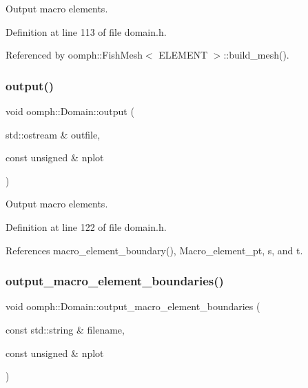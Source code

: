 Output macro elements. 



Definition at line 113 of file domain.\+h.



Referenced by oomph\+::\+Fish\+Mesh$<$ E\+L\+E\+M\+E\+N\+T $>$\+::build\+\_\+mesh().

\mbox{\label{classoomph_1_1Domain_ab7ccc375ba2e46ffb11e4e2c5c485578}} 
\subsubsection{\texorpdfstring{output()}{output()}\hspace{0.1cm}{\footnotesize\ttfamily [2/2]}}
{\footnotesize\ttfamily void oomph\+::\+Domain\+::output (\begin{DoxyParamCaption}\item[{std\+::ostream \&}]{outfile,  }\item[{const unsigned \&}]{nplot }\end{DoxyParamCaption})\hspace{0.3cm}{\ttfamily [inline]}}



Output macro elements. 



Definition at line 122 of file domain.\+h.



References macro\+\_\+element\+\_\+boundary(), Macro\+\_\+element\+\_\+pt, s, and t.

\mbox{\label{classoomph_1_1Domain_ac663be35932981a1c02b3ed930ec2eda}} 
\subsubsection{\texorpdfstring{output\+\_\+macro\+\_\+element\+\_\+boundaries()}{output\_macro\_element\_boundaries()}\hspace{0.1cm}{\footnotesize\ttfamily [1/2]}}
{\footnotesize\ttfamily void oomph\+::\+Domain\+::output\+\_\+macro\+\_\+element\+\_\+boundaries (\begin{DoxyParamCaption}\item[{const std\+::string \&}]{filename,  }\item[{const unsigned \&}]{nplot }\end{DoxyParamCaption})\hspace{0.3cm}{\ttfamily [inline]}}



